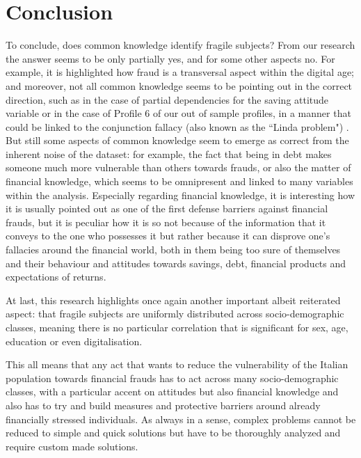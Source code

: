 \documentclass[a4paper,11pt]{article}
\begin{document}
\section{Conclusion}
To conclude, does common knowledge identify fragile subjects? From our research the answer seems to be only partially yes, and for some other aspects no. For example, it is highlighted how fraud is a transversal aspect within the digital age; and moreover, not all common knowledge seems to be pointing out in the correct direction, such as in the case of partial dependencies for the saving attitude variable or in the case of Profile 6 of our out of sample profiles, in a manner that could be linked to the conjunction fallacy (also known as the ``Linda problem") \cite{Linda}. But still some aspects of common knowledge seem to emerge as correct from the inherent noise of the dataset: for example, the fact that being in debt makes someone much more vulnerable than others towards frauds, or also the matter of financial knowledge, which seems to be omnipresent and linked to many variables within the analysis. Especially regarding financial knowledge, it is interesting how it is usually pointed out as one of the first defense barriers against financial frauds, but it is peculiar how it is so not because of the information that it conveys to the one who possesses it but rather because it can disprove one's fallacies around the financial world, both in them being too sure of themselves and their behaviour and attitudes towards savings, debt, financial products and expectations of returns. 

At last, this research highlights once again another important albeit reiterated aspect: that fragile subjects are uniformly distributed across socio-demographic classes, meaning there is no particular correlation that is significant for sex, age, education or even digitalisation. 

This all means that any act that wants to reduce the vulnerability of the Italian population towards financial frauds has to act across many socio-demographic classes, with a particular accent on attitudes but also financial knowledge and also has to try and build measures and protective barriers around already financially stressed individuals. As always in a sense, complex problems cannot be reduced to simple and quick solutions but have to be thoroughly analyzed and require custom made solutions.
\end{document}
